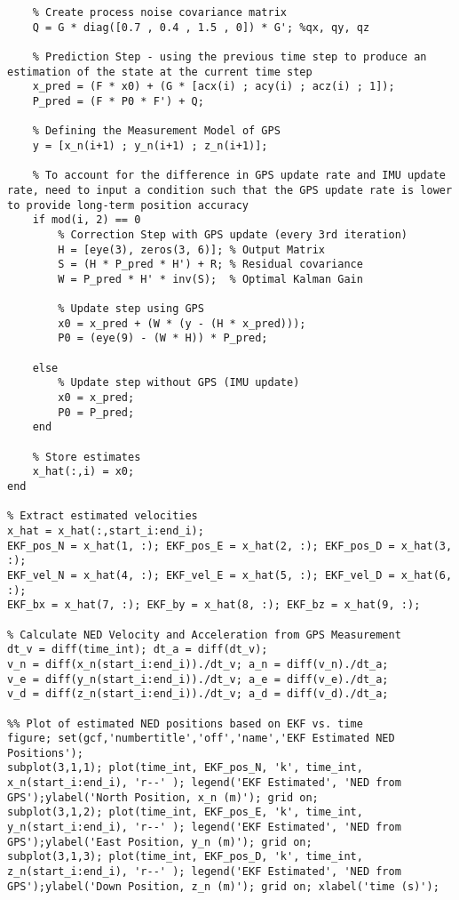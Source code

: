 \begin{lstlisting}
    % Create process noise covariance matrix
    Q = G * diag([0.7 , 0.4 , 1.5 , 0]) * G'; %qx, qy, qz

    % Prediction Step - using the previous time step to produce an estimation of the state at the current time step
    x_pred = (F * x0) + (G * [acx(i) ; acy(i) ; acz(i) ; 1]);
    P_pred = (F * P0 * F') + Q;

    % Defining the Measurement Model of GPS
    y = [x_n(i+1) ; y_n(i+1) ; z_n(i+1)];

    % To account for the difference in GPS update rate and IMU update rate, need to input a condition such that the GPS update rate is lower to provide long-term position accuracy
    if mod(i, 2) == 0
        % Correction Step with GPS update (every 3rd iteration)
        H = [eye(3), zeros(3, 6)]; % Output Matrix
        S = (H * P_pred * H') + R; % Residual covariance
        W = P_pred * H' * inv(S);  % Optimal Kalman Gain

        % Update step using GPS
        x0 = x_pred + (W * (y - (H * x_pred)));
        P0 = (eye(9) - (W * H)) * P_pred;
        
    else
        % Update step without GPS (IMU update)
        x0 = x_pred;
        P0 = P_pred;
    end

    % Store estimates
    x_hat(:,i) = x0;
end   

% Extract estimated velocities
x_hat = x_hat(:,start_i:end_i);
EKF_pos_N = x_hat(1, :); EKF_pos_E = x_hat(2, :); EKF_pos_D = x_hat(3, :);
EKF_vel_N = x_hat(4, :); EKF_vel_E = x_hat(5, :); EKF_vel_D = x_hat(6, :);
EKF_bx = x_hat(7, :); EKF_by = x_hat(8, :); EKF_bz = x_hat(9, :);

% Calculate NED Velocity and Acceleration from GPS Measurement
dt_v = diff(time_int); dt_a = diff(dt_v);
v_n = diff(x_n(start_i:end_i))./dt_v; a_n = diff(v_n)./dt_a;
v_e = diff(y_n(start_i:end_i))./dt_v; a_e = diff(v_e)./dt_a;
v_d = diff(z_n(start_i:end_i))./dt_v; a_d = diff(v_d)./dt_a;

%% Plot of estimated NED positions based on EKF vs. time
figure; set(gcf,'numbertitle','off','name','EKF Estimated NED Positions');  
subplot(3,1,1); plot(time_int, EKF_pos_N, 'k', time_int, x_n(start_i:end_i), 'r--' ); legend('EKF Estimated', 'NED from GPS');ylabel('North Position, x_n (m)'); grid on;
subplot(3,1,2); plot(time_int, EKF_pos_E, 'k', time_int, y_n(start_i:end_i), 'r--' ); legend('EKF Estimated', 'NED from GPS');ylabel('East Position, y_n (m)'); grid on;
subplot(3,1,3); plot(time_int, EKF_pos_D, 'k', time_int, z_n(start_i:end_i), 'r--' ); legend('EKF Estimated', 'NED from GPS');ylabel('Down Position, z_n (m)'); grid on; xlabel('time (s)');


\end{lstlisting}
